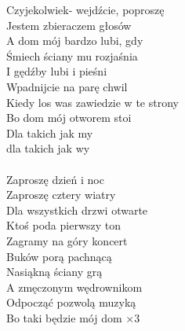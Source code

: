\documentclass[a5paper, 10pt]{book}
\begin{document}
\begin{minipage}[t]{0.65\textwidth}
Czyjekolwiek- wejdźcie, poproszę\\
Jestem zbieraczem głosów\\
A dom mój bardzo lubi, gdy\\
Śmiech ściany mu rozjaśnia\\
I gędźby lubi i pieśni\\
Wpadnijcie na parę chwil\\
Kiedy los was zawiedzie w te strony\\
Bo dom mój otworem stoi\\
Dla takich jak my\\ dla takich jak wy\\
\\
Zaproszę dzień i noc\\
Zaproszę cztery wiatry\\
Dla wszystkich drzwi otwarte\\
Ktoś poda pierwszy ton\\
Zagramy na góry koncert\\
Buków porą pachnącą\\
Nasiąkną ściany grą\\
A zmęczonym wędrownikom\\
Odpocząć pozwolą muzyką\\
Bo taki będzie mój dom $\times 3$\\

\end{minipage}
\end{document}

